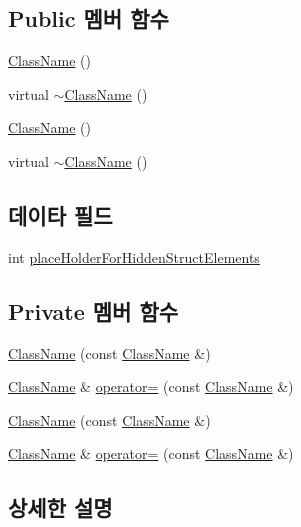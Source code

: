 \subsection*{Public 멤버 함수}
\begin{DoxyCompactItemize}
\item 
\hyperlink{class_class_name_a886b9bf1ce5326ed31640d33bfed2327}{Class\+Name} ()
\item 
virtual \hyperlink{class_class_name_a8e7fed951064f70653cb675bcbb03942}{$\sim$\+Class\+Name} ()
\item 
\hyperlink{class_class_name_a886b9bf1ce5326ed31640d33bfed2327}{Class\+Name} ()
\item 
virtual \hyperlink{class_class_name_a218512e9c890b20e05f51afdbd35dc83}{$\sim$\+Class\+Name} ()
\end{DoxyCompactItemize}
\subsection*{데이타 필드}
\begin{DoxyCompactItemize}
\item 
int \hyperlink{class_class_name_a5705d42d83aa1408a1f19b218cd11502}{place\+Holder\+For\+Hidden\+Struct\+Elements}
\end{DoxyCompactItemize}
\subsection*{Private 멤버 함수}
\begin{DoxyCompactItemize}
\item 
\hyperlink{class_class_name_a209f2852f06ce8e5fe108b78eecbf773}{Class\+Name} (const \hyperlink{class_class_name}{Class\+Name} \&)
\item 
\hyperlink{class_class_name}{Class\+Name} \& \hyperlink{class_class_name_aced1d3cede1f3b2c2098a6da38f942b4}{operator=} (const \hyperlink{class_class_name}{Class\+Name} \&)
\item 
\hyperlink{class_class_name_a209f2852f06ce8e5fe108b78eecbf773}{Class\+Name} (const \hyperlink{class_class_name}{Class\+Name} \&)
\item 
\hyperlink{class_class_name}{Class\+Name} \& \hyperlink{class_class_name_aced1d3cede1f3b2c2098a6da38f942b4}{operator=} (const \hyperlink{class_class_name}{Class\+Name} \&)
\end{DoxyCompactItemize}


\subsection{상세한 설명}


